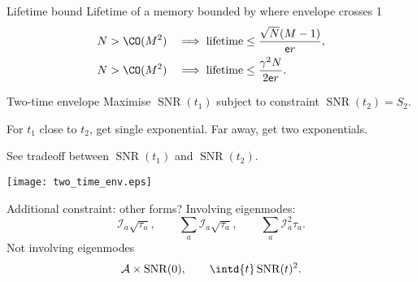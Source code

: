 \documentclass{beamer}%
\DeclareMathOperator{\snr}{SNR}
\newcommand{\initial}{\mathcal{I}}
\newcommand{\area}{\mathcal{A}}
\renewcommand{\e}{\mathsf{e}}
\begin{document}

\begin{frame}{Lifetime bound}
%
 Lifetime of a memory bounded by where envelope crosses 1
 \begin{equation*}
 \begin{aligned}
   N &> \CO(M^2) &\implies
   \text{lifetime} &\leq \frac{\sqrt{N}(M-1)}{\e r}, \\
   N &> \CO(M^2) &\implies
   \text{lifetime} &\leq \frac{\gamma^2{N}}{2\e r}. 
 \end{aligned}
 \end{equation*}
%
\end{frame}


\begin{frame}{Two-time envelope}
%
 Maximise $\snr(t_1)$ subject to constraint $\snr(t_2)=S_2$.
 
 \vp For $t_1$ close to $t_2$, get single exponential. Far away, get two exponentials.
 
 \vp See tradeoff between $\snr(t_1)$ and $\snr(t_2)$.
 
 \begin{center}
   \texttt{[image: two\_time\_env.eps]}
 \end{center}
%
\end{frame}


\begin{frame}{Additional constraint: other forms?}
%
 Involving eigenmodes:
 \begin{equation*}
   \initial_a \sqrt{\tau_a},
   \qquad
   \sum_a \initial_a \sqrt{\tau_a},
   \qquad
   \sum_a \initial_a^2 {\tau_a}.
 \end{equation*}
 Not involving eigenmodes
 \begin{equation*}
   \area \times \snr(0),
   \qquad
   \intd{t} \snr(t)^2.
 \end{equation*}
%
\end{frame}
\end{document}
